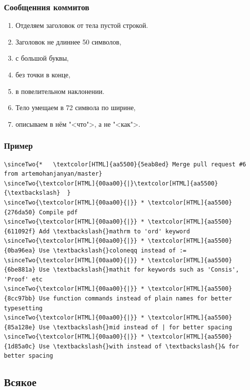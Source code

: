 \documentclass[pdf,russian]{beamer}
\begin{document}
\begin{frame}
    \frametitle{Сообщенния коммитов}
    \pause
    \begin{enumerate}
        \item Отделяем заголовок от тела пустой строкой.
        \item Заголовок не длиннее 50 символов,
        \item с большой буквы,
        \item без точки в конце,
        \item в повелительном наклонении.
        \item Тело умещаем в 72 символа по ширине,
        \item описываем в нём "<что">, а не "<как">.
    \end{enumerate}
\end{frame}

\begin{frame}[fragile]
    \frametitle{Пример}

    \newcommand{\sinceTwo}[1]{\onslide<3->{#1}}

    \pause
    \begin{Verbatim}[commandchars=\\\{\},fontsize=\relsize{-2}]
\sinceTwo{*   \textcolor[HTML]{aa5500}{5eab8ed} Merge pull request #6 from artemohanjanyan/master}
\sinceTwo{\textcolor[HTML]{00aa00}{|}\textcolor[HTML]{aa5500}{\textbackslash}  }
\sinceTwo{\textcolor[HTML]{00aa00}{|}} * \textcolor[HTML]{aa5500}{276da50} Compile pdf
\sinceTwo{\textcolor[HTML]{00aa00}{|}} * \textcolor[HTML]{aa5500}{611092f} Add \textbackslash{}mathrm to 'ord' keyword
\sinceTwo{\textcolor[HTML]{00aa00}{|}} * \textcolor[HTML]{aa5500}{0ba96ea} Use \textbackslash{}coloneqq instead of :=
\sinceTwo{\textcolor[HTML]{00aa00}{|}} * \textcolor[HTML]{aa5500}{6be881a} Use \textbackslash{}mathit for keywords such as 'Consis', 'Proof' etc
\sinceTwo{\textcolor[HTML]{00aa00}{|}} * \textcolor[HTML]{aa5500}{8cc97bb} Use function commands instead of plain names for better typesetting
\sinceTwo{\textcolor[HTML]{00aa00}{|}} * \textcolor[HTML]{aa5500}{85a128e} Use \textbackslash{}mid instead of | for better spacing
\sinceTwo{\textcolor[HTML]{00aa00}{|}} * \textcolor[HTML]{aa5500}{1d85a0c} Use \textbackslash{}with instead of \textbackslash{}& for better spacing
    \end{Verbatim}
\end{frame}

\subsection{Всякое}
\end{document}
